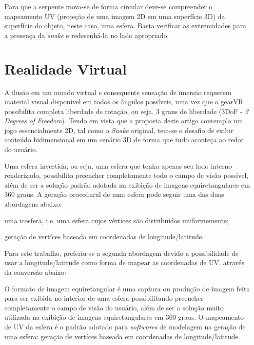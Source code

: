 \documentclass[conference]{IEEEtran}
\begin{document}
Para que a serpente mova-se de forma circular deve-se compreender o mapeamento UV (projeção de uma imagem 2D em uma superfície 3D) da superfície do objeto, neste caso, uma esfera. Basta verificar as extremidades para a presença da \textit{snake} e redesenhá-la no lado apropriado.

\section{Realidade Virtual}

A ilusão em um mundo virtual e consequente sensação de imersão requerem material visual disponível em todos os ângulos possíveis, uma vez que o gearVR possibilita completa liberdade de rotação, ou seja, 3 graus de liberdade (3DoF - \textit{3 Degrees of Freedom}). Tendo em vista que a proposta deste artigo contempla um jogo essencialmente 2D, tal como o \textit{Snake} original, tem-se o desafio de exibir conteúdo bidimensional em um cenário 3D de forma que tudo aconteça ao redor do usuário.

Uma esfera invertida, ou seja, uma esfera que tenha apenas seu lado interno renderizado, possibilita preencher completamente todo o campo de visão possível, além de ser a solução padrão adotada na exibição de imagens equiretangulares em 360 graus. A geração procedural de uma esfera pode seguir uma das duas abordagens abaixo:
\begin{enumerate}
  \begin{item} uma icosfera, i.e. uma esfera cujos vértices são distribuídos uniformemente; \end{item}
  \begin{item} geração de vertíces baseada em coordenadas de longitude/latitude. \end{item}
\end{enumerate}

Para este trabalho, preferiu-se a segunda abordagem devido a possibilidade de usar a longitude/latitude como forma de mapear as coordenadas de UV, através da conversão abaixo:

O formato de imagem equiretangular é uma captura ou produção de imagem feita para ser exibida no interior de uma esfera possibilitando preencher completamente o campo de visão do usuário, além de ser a solução muito utilizada na exibição de imagens equiretangulares em 360 graus. O mapeamento de UV da esfera é o padrão adotado para \textit{softwares} de modelagem na geração de uma esfera: geração de vertíces baseada em coordenadas de longitude/latitude.
\end{document}
